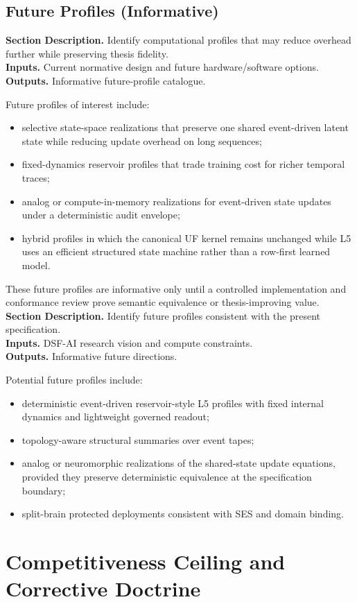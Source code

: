 \documentclass[11pt]{report}
\newcommand{\meta}[3]{\textbf{Section Description.} #1\\
\textbf{Inputs.} #2\\
\textbf{Outputs.} #3\par}
\begin{document}
\section{Future Profiles (Informative)}
\meta{Identify computational profiles that may reduce overhead further while preserving thesis fidelity.}{Current normative design and future hardware/software options.}{Informative future-profile catalogue.}

Future profiles of interest include:
\begin{itemize}
    \item selective state-space realizations that preserve one shared event-driven latent state while reducing update overhead on long sequences;
    \item fixed-dynamics reservoir profiles that trade training cost for richer temporal traces;
    \item analog or compute-in-memory realizations for event-driven state updates under a deterministic audit envelope;
    \item hybrid profiles in which the canonical UF kernel remains unchanged while L5 uses an efficient structured state machine rather than a row-first learned model.
\end{itemize}
These future profiles are informative only until a controlled implementation and conformance review prove semantic equivalence or thesis-improving value.
\meta{Identify future profiles consistent with the present specification.}{DSF-AI research vision and compute constraints.}{Informative future directions.}

Potential future profiles include:
\begin{itemize}
    \item deterministic event-driven reservoir-style L5 profiles with fixed internal dynamics and lightweight governed readout;
    \item topology-aware structural summaries over event tapes;
    \item analog or neuromorphic realizations of the shared-state update equations, provided they preserve deterministic equivalence at the specification boundary;
    \item split-brain protected deployments consistent with SES and domain binding.
\end{itemize}
\chapter{Competitiveness Ceiling and Corrective Doctrine}
\end{document}
